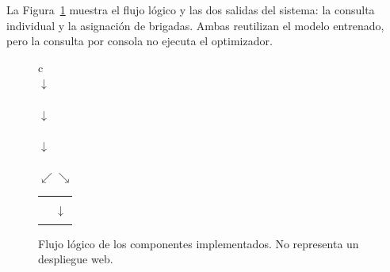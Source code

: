 \documentclass[12pt]{article}
\begin{document}
La Figura~\ref{fig:flujo_sistema} muestra el flujo lógico y las dos salidas del sistema: la consulta individual y la asignación de brigadas. Ambas reutilizan el modelo entrenado, pero la consulta por consola no ejecuta el optimizador.

\begin{figure}[H]
\centering
\setlength{\fboxsep}{7pt}
\small
\begin{tabular}{c}
\\[2pt]
$\downarrow$\\[2pt]
\\[2pt]
$\downarrow$\\[2pt]
\\[2pt]
$\downarrow$\\[2pt]
\\[2pt]
$\swarrow$\hspace{7cm}$\searrow$\\[2pt]
\begin{tabular}{@{}c@{\hspace{0.5cm}}c@{}}
\fbox{\parbox{5.8cm}{\centering\textbf{Consulta individual}\\Nombre o código del municipio\\Salida descriptiva en consola}}&
\fbox{\parbox{5.8cm}{\centering\textbf{Asignación MILP}\\Probabilidad, vulnerabilidad y distancia\\Flota y cuota de resguardos}}\\[2pt]
&$\downarrow$\\[2pt]
&\fbox{\parbox{5.8cm}{\centering\textbf{Plan de despacho}\\Municipios seleccionados\\Exportación a CSV}}
\end{tabular}
\end{tabular}
\caption{Flujo lógico de los componentes implementados. No representa un despliegue web.}
\label{fig:flujo_sistema}
\end{figure}
\end{document}
